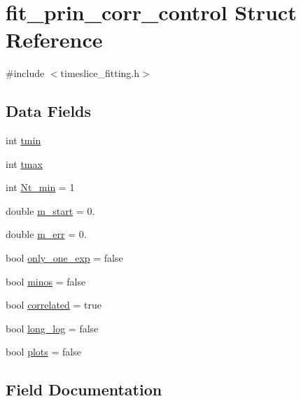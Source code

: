 \hypertarget{structfit__prin__corr__control}{}\section{fit\+\_\+prin\+\_\+corr\+\_\+control Struct Reference}
\label{structfit__prin__corr__control}


{\ttfamily \#include $<$timeslice\+\_\+fitting.\+h$>$}

\subsection*{Data Fields}
\begin{DoxyCompactItemize}
\item 
int \mbox{\hyperlink{structfit__prin__corr__control_a52c3c241301827f01f7c96f31b55e389}{tmin}}
\item 
int \mbox{\hyperlink{structfit__prin__corr__control_aee3398cba4919d4f93e65af028f1f90e}{tmax}}
\item 
int \mbox{\hyperlink{structfit__prin__corr__control_a674dd6d29e1a3fc7bd9a3e520049492c}{Nt\+\_\+min}} = 1
\item 
double \mbox{\hyperlink{structfit__prin__corr__control_a9a8251fcd5d0375c8aa3a34ab49b4001}{m\+\_\+start}} = 0.
\item 
double \mbox{\hyperlink{structfit__prin__corr__control_a8c73d9d0eda22bb20a2cfbc25a873cb4}{m\+\_\+err}} = 0.
\item 
bool \mbox{\hyperlink{structfit__prin__corr__control_aa72359ee3b9812cf765b3c8b27e7ea99}{only\+\_\+one\+\_\+exp}} = false
\item 
bool \mbox{\hyperlink{structfit__prin__corr__control_a6583e9fc28d760ac47a2837a44893db0}{minos}} = false
\item 
bool \mbox{\hyperlink{structfit__prin__corr__control_a714658ead1ea31899a0f6a2c308c95ed}{correlated}} = true
\item 
bool \mbox{\hyperlink{structfit__prin__corr__control_af06f6ebd700f27eaeee0f3a5e887df58}{long\+\_\+log}} = false
\item 
bool \mbox{\hyperlink{structfit__prin__corr__control_acde17676cf1739da2347b19440aec136}{plots}} = false
\end{DoxyCompactItemize}


\subsection{Field Documentation}
\mbox{\label{structfit__prin__corr__control_a714658ead1ea31899a0f6a2c308c95ed}} 
